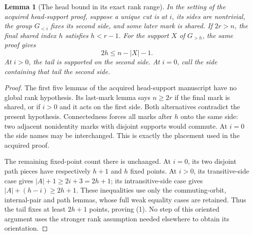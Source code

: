 \documentclass[11pt,a4paper]{article}
\newtheorem{lemma}{Lemma}\newtheorem{theorem}[lemma]{Theorem}
\begin{document}
\begin{lemma}[The head bound in its exact rank range]\label{head}
In the setting of the acquired head-support proof, suppose
a unique cut is at $i$, its sides are nontrivial, the group
$G_{<i}$ fixes its second side, and some later mark is shared.
If $2r>n$, the final shared index $h$ satisfies $h<r-1$.
For the support $X$ of $G_{>h}$, the same proof gives
\[
                       2h\le n-|X|-1.                 \tag{1}
\]
At $i>0$, the tail is supported on the second side. At
$i=0$, call the side containing that tail the second side.
\end{lemma}
\begin{proof}
The first five lemmas of the acquired head-support manuscript
have no global rank hypothesis. Its last-mark lemma says
$n\ge2r$ if the final mark is shared, or if $i>0$ and it
acts on the first side. Both alternatives contradict the
present hypothesis. Connectedness forces all marks after
$h$ onto the same side: two adjacent nonidentity marks with
disjoint supports would commute. At $i=0$ the side names
may be interchanged. This is exactly the placement used
in the acquired proof.

The remaining fixed-point count there is unchanged. At
$i=0$, its two disjoint path pieces have respectively
$h+1$ and $h$ fixed points. At $i>0$, its transitive-side
case gives $|A|+1\ge2i+3=2h+1$; its intransitive-side
case gives $|A|+(h-i)\ge2h+1$. These inequalities use
only the commuting-orbit, internal-pair and path lemmas,
whose full weak equality cases are retained. Thus the
tail fixes at least $2h+1$ points, proving (1).
No step of this oriented argument uses the stronger
rank assumption needed elsewhere to obtain its orientation.
\end{proof}
\end{document}
